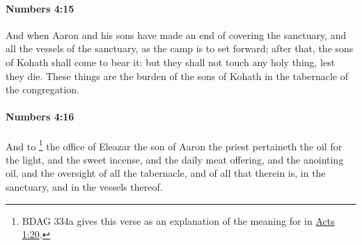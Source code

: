 		\paragraph{Numbers 4:15} %
			\label{NUMBERS-4-15}

			And when Aaron and his sons have made an end of covering the sanctuary, and all the vessels of the sanctuary, as the camp is to set forward; after that, the sons of Kohath shall come to bear it: but they shall not touch any holy thing, lest they die. These things are the burden of the sons of Kohath in the tabernacle of the congregation.


		\paragraph{Numbers 4:16} %
			\label{NUMBERS-4-16}

			And to%
				\footnote{%
					BDAG 334a gives this verse as an explanation of the meaning for  in \hyperref[ACTS-1-20]{Acts 1:20}.
					}
			the office of Eleazar the son of Aaron the priest pertaineth the oil for the light, and the sweet incense, and the daily meat offering, and the anointing oil, and the oversight of all the tabernacle, and of all that therein is, in the sanctuary, and in the vessels thereof.

